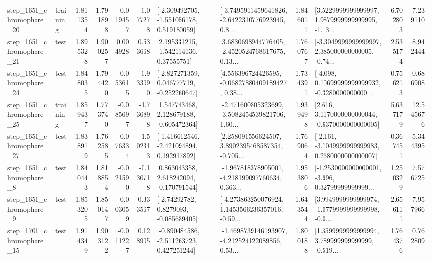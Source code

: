 \begin{tabular}{llrrrrllrlrr}
 step\_1651\_chromophore\_20 &  training &      1.811354 &    1.791898 &     -0.019457 & -0.077278 &   [-2.309492705, -1.551056178, 0.519180059] &  [-3.7495911459641826, -2.6422310776923945, 0.8... &       1.846011 &  [3.5229999999999997, 1.9879999999999995, -1.13... &            6.702803 &          7.239110 \\
 step\_1651\_chromophore\_21 &      test &      1.895328 &    1.900257 &      0.004928 &  0.533668 &     [2.195331215, -1.542114136, 0.37555751] &  [3.6830698944776405, -2.4520524768617675, 0.13... &       1.760767 &  [-3.3049999999999997, 2.385000000000005, -0.74... &            2.535174 &          8.942444 \\
 step\_1651\_chromophore\_24 &      test &      1.848035 &    1.794420 &     -0.053615 & -0.933090 &   [-2.827271359, 0.046777719, -0.252260647] &  [4.556396724426595, -0.06827880409189427, 0.38... &       1.734391 &  [-4.098, 0.10699999999999932, -0.3280000000000... &            0.756213 &          0.686908 \\
 step\_1651\_chromophore\_25 &  training &      1.859437 &    1.773740 &     -0.085697 & -1.736898 &    [1.547743468, 2.128679188, -0.605472364] &  [-2.471600805323699, -3.5082454539821706, 1.60... &       1.939498 &   [2.616, 3.1170000000000044, -0.6370000000000005] &            5.637179 &         12.545676 \\
 step\_1651\_chromophore\_27 &      test &      1.838919 &    1.762585 &     -0.076334 & -1.502313 &   [-1.416612546, -2.421094894, 0.192917892] &  [2.258091556624507, 3.8902395468587354, -0.705... &       1.769064 &  [-2.161, -3.7049999999999983, 0.2680000000000007] &            0.367451 &          5.344395 \\
  step\_1651\_chromophore\_8 &      test &      1.840443 &    1.818854 &     -0.021590 & -0.130718 &    [0.863043358, 2.618242094, -0.170791544] &  [-1.967818378905001, -4.218199097760634, 0.363... &       1.953806 &  [-1.2530000000000001, -3.996, 0.32799999999999... &            1.250329 &          7.576725 \\
  step\_1651\_chromophore\_9 &      test &      1.853205 &    1.850147 &     -0.003059 &  0.333567 &      [-2.74292782, 0.8279093, -0.085689405] &  [-4.273863250076924, 1.1453566236357016, -0.59... &       1.643544 &  [3.9949999999999974, -1.0779999999999998, -0.0... &            2.656111 &          7.957966 \\
 step\_1701\_chromophore\_15 &      test &      1.914349 &    1.903122 &     -0.011227 &  0.128905 &   [-0.890484586, -2.511263723, 0.427251244] &  [-1.4698739146193907, -4.212524122089856, 0.53... &       1.800188 &  [1.3599999999999994, 3.789999999999999, -0.519... &            1.764376 &          0.762809 \\

\end{tabular}
